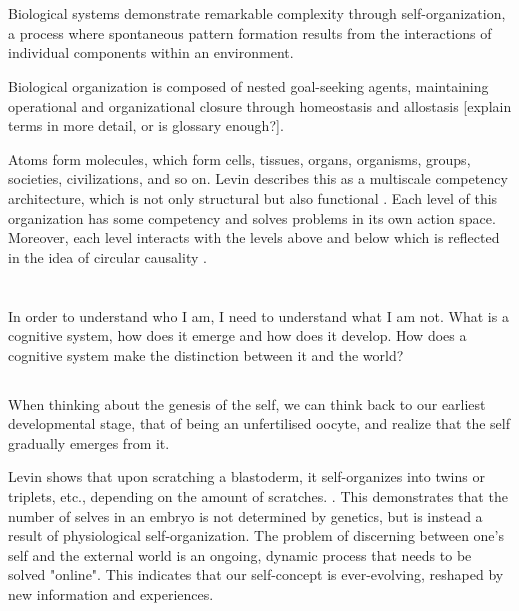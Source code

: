 \section{}

Biological systems demonstrate remarkable complexity through self-organization, a process where spontaneous pattern formation results from the interactions of individual components within an environment. 

Biological organization is composed of nested goal-seeking agents, maintaining operational and organizational closure through homeostasis and allostasis \cite{ciaunica_nested_2023, vernon_embodied_2015} [explain terms in more detail, or is glossary enough?].

Atoms form molecules, which form cells, tissues, organs, organisms, groups, societies, civilizations, and so on. Levin describes this as a multiscale competency architecture, which is not only structural but also functional \cite{Levin_2023}. Each level of this organization has some competency and solves problems in its own action space. Moreover, each level interacts with the levels above and below which is reflected in the idea of circular causality \cite{ciaunica_nested_2023, vernon_embodied_2015}. 





\section{}
In order to understand who I am, I need to understand what I am not.
What is a cognitive system, how does it emerge and how does it develop.
How does a cognitive system make the distinction between it and the world?

\subsection{}

When thinking about the genesis of the self, we can think back to our earliest developmental stage, that of being an unfertilised \gls{oocyte}, and realize that the self gradually emerges from it.

Levin shows that upon scratching a \gls{blastoderm}, it self-organizes into twins or triplets, etc., depending on the amount of scratches. . This demonstrates that the number of selves in an \gls{embryo} is not determined by genetics, but is instead a result of physiological self-organization. The problem of discerning between one's self and the external world is an ongoing, dynamic process that needs to be solved "online". This indicates that our self-concept is ever-evolving, reshaped by new information and experiences.

